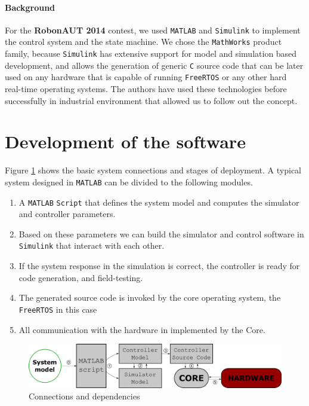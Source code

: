 \paragraph{Background}

For the \textbf{RobonAUT 2014} contest, we used \verb!MATLAB! and \verb!Simulink! to implement the control system and the state machine. We chose the \verb!MathWorks! product family, because \verb!Simulink! has extensive support for model and simulation based development, and allows the generation of generic \verb!C! source code that can be later used on any hardware that is capable of running \verb!FreeRTOS! or any other hard real-time operating systems. The authors have used these technologies before successfully in industrial environment that allowed us to follow out the concept.

\section{Development of the software}


Figure \ref{fig:architecture} shows the basic system connections and stages of deployment. A typical system designed in \verb!MATLAB! can be divided to the following modules.

\begin{enumerate}
\item A \verb!MATLAB! \verb!Script! that defines the system model and computes the simulator and controller parameters.
\item Based on these parameters we can build the simulator and control software in \verb!Simulink! that interact with each other.
\item If the system response in the simulation is correct, the controller is ready for code generation, and field-testing.
\item The generated source code is invoked by the core operating system, the \verb!FreeRTOS! in this case
\item All communication with the hardware in implemented by the Core.
\end{enumerate}

\begin{figure}[!ht]
    \centering
    \includegraphics[width=\linewidth]{img/architecture}
    \caption{Connections and dependencies}
    \label{fig:architecture}
\end{figure}

